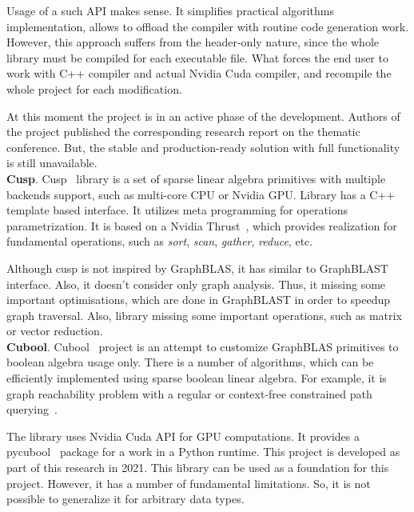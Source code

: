Usage of a such API makes sense. It simplifies practical algorithms implementation, allows to offload the compiler with routine code generation work. However, this approach suffers from the header-only nature, since the whole library must be compiled for each executable file. What forces the end user to work with C++ compiler and actual Nvidia Cuda compiler, and recompile the whole project for each modification. 

At this moment the project is in an active phase of the development. Authors of the project published the corresponding research report on the thematic conference. But, the stable and production-ready solution with full functionality is still unavailable.\\

\textbf{Cusp}. Cusp~\cite{net:cusplibrary} library is a set of sparse linear algebra primitives with multiple backends support, such as multi-core CPU or Nvidia GPU. Library has a C++ template based interface. It utilizes meta programming for operations parametrization. It is based on a Nvidia Thrust~\cite{net:cuda_thrust}, which provides realization for fundamental operations, such as \textit{sort}, \textit{scan}, \textit{gather}, \textit{reduce}, etc.

Although cusp is not inspired by GraphBLAS, it has similar to GraphBLAST interface. Also, it doesn't consider only graph analysis. Thus, it missing some important optimisations, which are done in GraphBLAST in order to speedup graph traversal. Also, library missing some important operations, such as matrix or vector reduction.\\

\textbf{Cubool}. Cubool~\cite{net:cubool_project} project is an attempt to customize GraphBLAS primitives to boolean algebra usage only. There is a number of algorithms, which can be efficiently implemented using sparse boolean linear algebra. For example, it is graph reachability problem with a regular or context-free constrained path querying~\cite{inproceedings:cfpq_matrix_evaluation, inbook:kronecker_cfpq_adbis, inproceedings:matrix_cfpq, inproceedings:cfqp_matrix_with_single_source}.

The library uses Nvidia Cuda API for GPU computations. It provides a pycubool~\cite{net:pycubool} package for a work in a Python runtime. This project is developed as part of this research in 2021. This library can be used as a foundation for this project. However, it has a number of fundamental limitations. So, it is not possible to generalize it for arbitrary data types.

